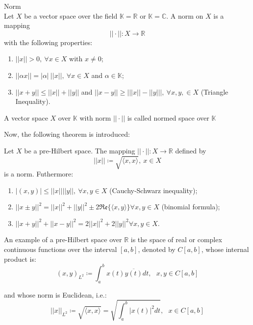 			\begin{definition}\label{def:app:functional:3}
				Norm \\
				Let $X$ be a vector space over the field $\mathbb{K}=\mathbb{R}$ or $\mathbb{K}=\mathbb{C}$. A norm on $X$ is a mapping $$||\cdot|| : X\rightarrow\mathbb{R}$$ with the following properties:
				\begin{enumerate}
					\item $||x||>0,~\forall x\in X$ with $x\neq0$;
					\item $||\alpha x|| = |\alpha|~||x||,~\forall x\in X$ and $\alpha\in\mathbb{K}$;
					\item $||x+y|| \le ||x||+||y||$ and $||x-y|| \ge \Big| ||x||-||y||\Big| ,~\forall x,y,\in X$ (Triangle Inequality).
				\end{enumerate}
				A vector space $X$ over $\mathbb{K}$ with norm $||\cdot||$ is called normed space over $\mathbb{K}$
			\end{definition}
			
			Now, the following theorem is introduced:
			\begin{theorem}\label{the:app:functional:1}
				Let $X$ be a pre-Hilbert space. The mapping $||\cdot|| : X\rightarrow\mathbb{R}$ defined by $$||x||\coloneqq\sqrt{\langle x,x\rangle},~x\in X$$ is a norm. Futhermore:
				\begin{enumerate}
					\item $|(x,y)|\le||x||||y||,~\forall x,y\in X$ (Cauchy-Schwarz inequality);
					\item $||x\pm y||^2 = ||x||^2+||y||^2\pm 2\mathfrak{Re}\{\langle x,y\rangle\}\forall x,y\in X$ (binomial formula);
					\item  $||x+y||^2 + ||x-y||^2 = 2||x||^2+2||y||^2\forall x,y\in X$.
				\end{enumerate}
			\end{theorem}
		
			An example of a pre-Hilbert space over $\mathbb{R}$ is the space of real or complex continuous functions over the interval $[a,b]$, denoted by $C[a,b]$, whose internal product is:
			\begin{equation}
				(x,y)_{L^2} \coloneqq\int_a^b x(t)\overline{y(t)}dt,~~~x,y\in C[a,b] \label{eq:app:functional:1}
			\end{equation}
		
			\noindent and whose norm is Euclidean, i.e.:
			\begin{equation}
				||x||_{L^2}\coloneqq\sqrt{\langle x,x\rangle} = \sqrt{\int_a^b |x(t)|^2dt},~~~ x\in C[a,b] \label{eq:app:functional:2}
			\end{equation}
		
